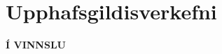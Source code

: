 \documentclass[A4paper,10pt,icelandic]{sphinxmanual}
\begin{document}
 \chapter{Upphafsgildisverkefni}
 \textbf{Í VINNSLU}
% 
% 
% 
% 
% 
% 
% 
% 
% 
% 
\end{document}
